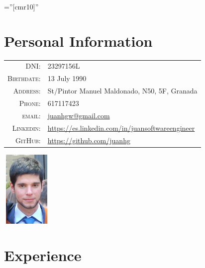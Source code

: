 \documentclass[a4paper,10pt]{article} %
\begin{document}
\font\fb=''[cmr10]'' %


\par{\bigskip\par} %

\section{Personal Information}

\noindent\begin{minipage}{0.3\textwidth}%
\begin{tabular}{rl}
\textsc{DNI:} & 23297156L \\
\textsc{Birthdate:} &  13 July 1990 \\
\textsc{Address:} & St/Pintor Manuel Maldonado, N50, 5F, Granada \\
\textsc{Phone:} & 617117423\\
\textsc{email:} & \href{mailto:juanhgw@gmail.com}{juanhgw@gmail.com} \\
\textsc{Linkedin:} & \url{https://es.linkedin.com/in/juansoftwareengineer} \\
\textsc{GitHub:} & \url{https://github.com/juanhg}
\end{tabular}
\end{minipage}%
\hfill%
\begin{minipage}{0.6\textwidth}\raggedleft
\includegraphics[width=24mm, height=37mm]{pictures/photo2}
\end{minipage}



\section{Experience}
\end{document}
